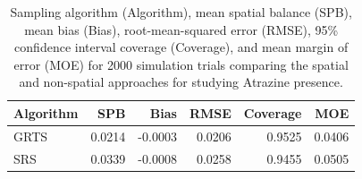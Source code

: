 \documentclass[
  shortnames]{jss}
\begin{document}
\begin{table}[t!]
\centering
\begin{tabular}{lrrrrr}
  \hline
Algorithm & SPB & Bias & RMSE & Coverage & MOE \\ 
  \hline
GRTS & 0.0214 & -0.0003 & 0.0206 & 0.9525 & 0.0406 \\ 
  SRS & 0.0339 & -0.0008 & 0.0258 & 0.9455 & 0.0505 \\ 
   \hline
\end{tabular}
\caption{Sampling algorithm (Algorithm), mean spatial balance (SPB), mean bias (Bias), root-mean-squared error (RMSE), 95\% confidence interval coverage (Coverage), and mean margin of error (MOE) for 2000 simulation trials comparing the spatial and non-spatial approaches for studying Atrazine presence.} 
\label{tab:atrazine_tab}
\end{table}
\end{document}

